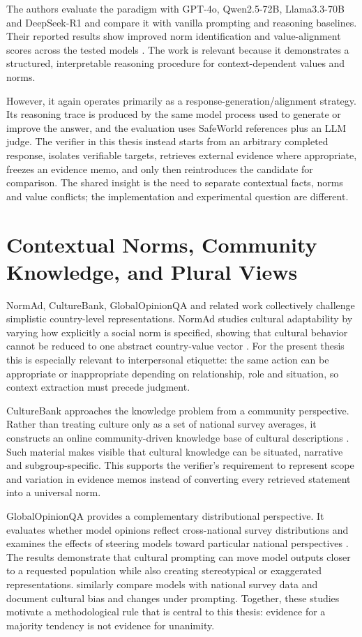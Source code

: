 The authors evaluate the paradigm with GPT-4o, Qwen2.5-72B, Llama3.3-70B and DeepSeek-R1 and compare it with vanilla prompting and reasoning baselines. Their reported results show improved norm identification and value-alignment scores across the tested models \parencite{wang2025ethicalreasoning}. The work is relevant because it demonstrates a structured, interpretable reasoning procedure for context-dependent values and norms.

However, it again operates primarily as a response-generation/alignment strategy. Its reasoning trace is produced by the same model process used to generate or improve the answer, and the evaluation uses SafeWorld references plus an LLM judge. The verifier in this thesis instead starts from an arbitrary completed response, isolates verifiable targets, retrieves external evidence where appropriate, freezes an evidence memo, and only then reintroduces the candidate for comparison. The shared insight is the need to separate contextual facts, norms and value conflicts; the implementation and experimental question are different.

\section{Contextual Norms, Community Knowledge, and Plural Views}

NormAd, CultureBank, GlobalOpinionQA and related work collectively challenge simplistic country-level representations. NormAd studies cultural adaptability by varying how explicitly a social norm is specified, showing that cultural behavior cannot be reduced to one abstract country-value vector \parencite{rao2025normad}. For the present thesis this is especially relevant to interpersonal etiquette: the same action can be appropriate or inappropriate depending on relationship, role and situation, so context extraction must precede judgment.

CultureBank approaches the knowledge problem from a community perspective. Rather than treating culture only as a set of national survey averages, it constructs an online community-driven knowledge base of cultural descriptions \parencite{shi2024culturebank}. Such material makes visible that cultural knowledge can be situated, narrative and subgroup-specific. This supports the verifier's requirement to represent scope and variation in evidence memos instead of converting every retrieved statement into a universal norm.

GlobalOpinionQA provides a complementary distributional perspective. It evaluates whether model opinions reflect cross-national survey distributions and examines the effects of steering models toward particular national perspectives \parencite{durmus2023globalopinionqa}. The results demonstrate that cultural prompting can move model outputs closer to a requested population while also creating stereotypical or exaggerated representations. \textcite{tao2024culturalbias} similarly compare models with national survey data and document cultural bias and changes under prompting. Together, these studies motivate a methodological rule that is central to this thesis: evidence for a majority tendency is not evidence for unanimity.

